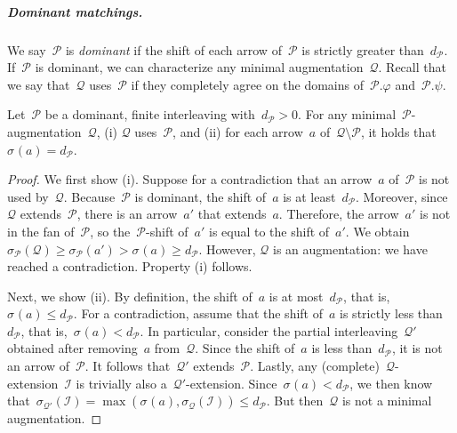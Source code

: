 \documentclass[a4paper,UKenglish, autoref, thm-restate, cleveref]{lipics-v2021}
\newcommand{\shift}[1]{\sigma_{#1}}
\newcommand{\resdist}[1]{d_{#1}}
\renewcommand{\phi}{\varphi}
\newcommand{\I}{\mathcal{I}}
\renewcommand{\P}{\mathcal{P}}
\newcommand{\Q}{\mathcal{Q}}
\begin{document}
\subparagraph{Dominant matchings.}
We say~$\P$ is \emph{dominant} if the shift of each arrow of~$\P$ is strictly greater than~$\resdist{\P}$.
If~$\P$ is dominant, we can characterize any minimal augmentation~$\Q$.
Recall that we say that~$\Q$ uses~$\P$ if they completely agree on the domains of~$\P.\phi$ and~$\P.\psi$.

\begin{lemma}\label{lem:optimal-uses}
Let~$\P$ be a dominant, finite interleaving with~$\resdist{\P} > 0$.
For any minimal~$\P$-augmentation~$\Q$, (i) $\Q$ uses~$\P$, and (ii) for each arrow~$a$ of~$\Q \setminus \P$, it holds that~$\shift{}(a) = \resdist{\P}$.
\end{lemma}
\begin{proof}
We first show (i).
Suppose for a contradiction that an arrow~$a$ of~$\P$ is not used by~$\Q$.
Because~$\P$ is dominant, the shift of~$a$ is at least~$\resdist{\P}$.
Moreover, since~$\Q$ extends~$\P$, there is an arrow~$a'$ that extends~$a$.
Therefore, the arrow~$a'$ is not in the fan of~$\P$, so the~$\P$-shift of~$a'$ is equal to the shift of~$a'$.
We obtain~$\shift{\P}(\Q) \ge \shift{\P}(a') > \shift{}(a) \ge \resdist{\P}$.
However, $\Q$ is an augmentation: we have reached a contradiction.
Property (i) follows.

Next, we show (ii).
By definition, the shift of~$a$ is at most~$\resdist{\P}$, that is,~$\shift{}(a) \le \resdist{\P}$.
For a contradiction, assume that the shift of~$a$ is strictly less than~$\resdist{\P}$, that is,~$\shift{}(a) < \resdist{\P}$.
In particular, consider the partial interleaving~$\Q'$ obtained after removing~$a$ from~$\Q$.
Since the shift of~$a$ is less than~$\resdist{\P}$, it is not an arrow of~$\P$.
It follows that~$\Q'$ extends~$\P$.
Lastly, any (complete)~$\Q$-extension~$\I$ is trivially also a~$\Q'$-extension.
Since~$\shift{}(a) < \resdist{\P}$, we then know that~$\shift{\Q'}(\I) = \max(\shift{}(a), \shift{\Q}(\I)) \le \resdist{\P}$.
But then~$\Q$ is not a minimal augmentation.
\end{proof}
\end{document}
